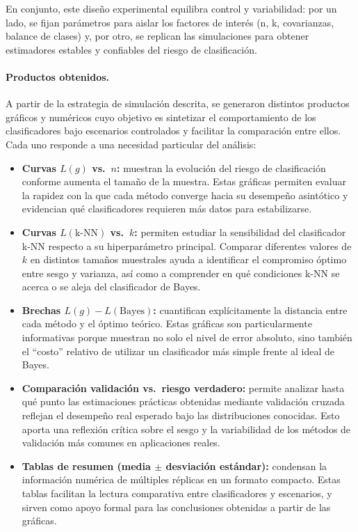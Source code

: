 \documentclass[10pt]{article}
\begin{document}
En conjunto, este diseño experimental equilibra control y variabilidad: por un lado, se fijan parámetros para aislar los factores de interés (n, k, covarianzas, balance de clases) y, por otro, se replican las simulaciones para obtener estimadores estables y confiables del riesgo de clasificación.


\paragraph{Productos obtenidos.}
A partir de la estrategia de simulación descrita, se generaron distintos productos gráficos y numéricos cuyo objetivo es sintetizar el comportamiento de los clasificadores bajo escenarios controlados y facilitar la comparación entre ellos. Cada uno responde a una necesidad particular del análisis:

\begin{itemize}
    \item \textbf{Curvas $L(g)$ vs.\ $n$:} muestran la evolución del riesgo de clasificación conforme aumenta el tamaño de la muestra. Estas gráficas permiten evaluar la rapidez con la que cada método converge hacia su desempeño asintótico y evidencian qué clasificadores requieren más datos para estabilizarse.

    \item \textbf{Curvas $L(\text{k-NN})$ vs.\ $k$:} permiten estudiar la sensibilidad del clasificador k-NN respecto a su hiperparámetro principal. Comparar diferentes valores de $k$ en distintos tamaños muestrales ayuda a identificar el compromiso óptimo entre sesgo y varianza, así como a comprender en qué condiciones k-NN se acerca o se aleja del clasificador de Bayes.

    \item \textbf{Brechas $L(g) - L(\text{Bayes})$:} cuantifican explícitamente la distancia entre cada método y el óptimo teórico. Estas gráficas son particularmente informativas porque muestran no solo el nivel de error absoluto, sino también el “costo” relativo de utilizar un clasificador más simple frente al ideal de Bayes.

    \item \textbf{Comparación validación vs.\ riesgo verdadero:} permite analizar hasta qué punto las estimaciones prácticas obtenidas mediante validación cruzada reflejan el desempeño real esperado bajo las distribuciones conocidas. Esto aporta una reflexión crítica sobre el sesgo y la variabilidad de los métodos de validación más comunes en aplicaciones reales.

    \item \textbf{Tablas de resumen (media $\pm$ desviación estándar):} condensan la información numérica de múltiples réplicas en un formato compacto. Estas tablas facilitan la lectura comparativa entre clasificadores y escenarios, y sirven como apoyo formal para las conclusiones obtenidas a partir de las gráficas.
\end{itemize}
\end{document}
